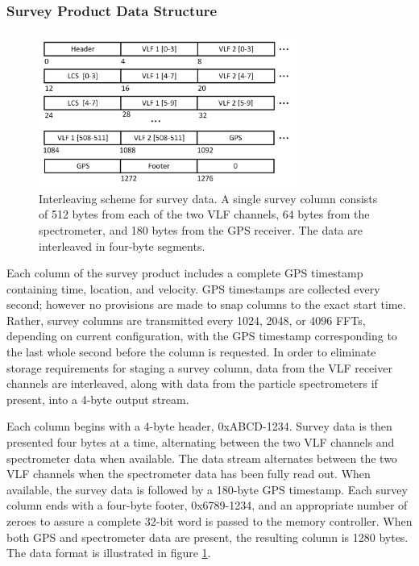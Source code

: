 \subsubsection{Survey Product Data Structure}
\begin{figure}[h]
\begin{center}
\includegraphics[width=20pc]{figures/vpm_figures/survey_datastructure_column_v2.png}

\caption[Interleaving scheme for survey data]{Interleaving scheme for survey data. A single survey column consists of 512 bytes from each of the two VLF channels, 64 bytes from the spectrometer, and 180 bytes from the GPS receiver. The data are interleaved in four-byte segments.}
\label{fig:survey_data_format}
\end{center}
\end{figure}
Each column of the survey product includes a complete GPS timestamp containing time, location, and velocity. GPS timestamps are collected every second; however no provisions are made to snap columns to the exact start time. Rather, survey columns are transmitted every 1024, 2048, or 4096 FFTs, depending on current configuration, with the GPS timestamp corresponding to the last whole second before the column is requested. In order to eliminate storage requirements for staging a survey column, data from the VLF receiver channels are interleaved, along with data from the particle spectrometers if present, into a 4-byte output stream.

Each column begins with a 4-byte header, 0xABCD-1234. Survey data is then presented four bytes at a time, alternating between the two VLF channels and spectrometer data when available. The data stream alternates between the two VLF channels when the spectrometer data has been fully read out. When available, the survey data is followed by a 180-byte GPS timestamp. Each survey column ends with a four-byte footer, 0x6789-1234, and an appropriate number of zeroes to assure a complete 32-bit word is passed to the memory controller. When both GPS and spectrometer data are present, the resulting column is 1280 bytes. The data format is illustrated in figure \ref{fig:survey_data_format}.

